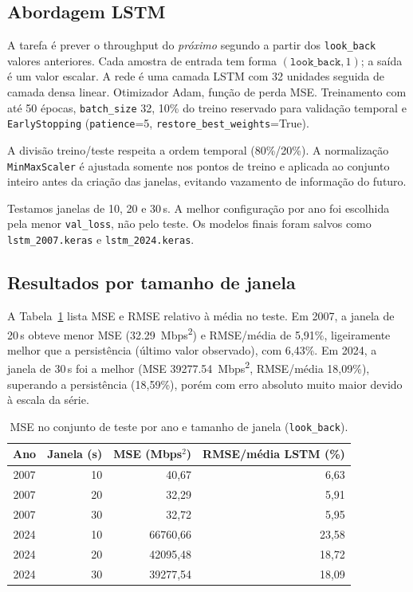 \documentclass[12pt,a4paper]{article}
\begin{document}
\subsection{Abordagem LSTM}

A tarefa é prever o throughput do \emph{próximo} segundo a partir dos
\texttt{look\_back} valores anteriores. Cada amostra de entrada tem forma
$(\texttt{look\_back}, 1)$; a saída é um valor escalar. A rede é uma camada LSTM com
32 unidades seguida de camada densa linear. Otimizador Adam, função de perda MSE.
Treinamento com até 50 épocas, \texttt{batch\_size} 32, 10\% do treino reservado para
validação temporal e \texttt{EarlyStopping} (\texttt{patience}=5,
\texttt{restore\_best\_weights}=True).

A divisão treino/teste respeita a ordem temporal (80\%/20\%). A normalização
\texttt{MinMaxScaler} é ajustada somente nos pontos de treino e aplicada ao conjunto
inteiro antes da criação das janelas, evitando vazamento de informação do futuro.

Testamos janelas de 10, 20 e 30\,s. A melhor configuração por ano foi escolhida pela
menor \texttt{val\_loss}, não pelo teste. Os modelos finais foram salvos como
\texttt{lstm\_2007.keras} e \texttt{lstm\_2024.keras}.

\subsection{Resultados por tamanho de janela}

A Tabela~\ref{tab:mse-janela} lista MSE e RMSE relativo à média no teste. Em 2007, a
janela de 20\,s obteve menor MSE (\SI{32,29}{Mbps^2}) e RMSE/média de 5,91\%, ligeiramente
melhor que a persistência (último valor observado), com 6,43\%. Em 2024, a janela de
30\,s foi a melhor (MSE \SI{39277,54}{Mbps^2}, RMSE/média 18,09\%), superando a
persistência (18,59\%), porém com erro absoluto muito maior devido à escala da série.

\begin{table}[htbp]
  \centering
  \caption{MSE no conjunto de teste por ano e tamanho de janela (\texttt{look\_back}).}
  \label{tab:mse-janela}
  \begin{tabular}{crrr}
    \toprule
    Ano & Janela (s) & MSE (Mbps$^2$) & RMSE/média LSTM (\%) \\
    \midrule
    2007 & 10 & 40,67 & 6,63 \\
    2007 & 20 & 32,29 & 5,91 \\
    2007 & 30 & 32,72 & 5,95 \\
    2024 & 10 & 66760,66 & 23,58 \\
    2024 & 20 & 42095,48 & 18,72 \\
    2024 & 30 & 39277,54 & 18,09 \\
    \bottomrule
  \end{tabular}
\end{table}
\end{document}
